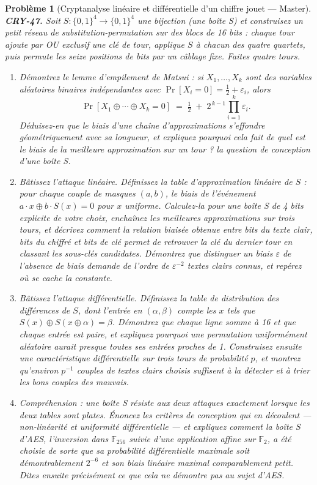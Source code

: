 \documentclass[11pt]{article}
\newtheorem{problem}{Problème}
\begin{document}
\begin{problem}[{Cryptanalyse linéaire et différentielle d'un chiffre jouet --- Master}]
\textbf{CRY-47.} Soit $S \colon \{0,1\}^4 \to \{0,1\}^4$ une bijection (une boîte S) et
construisez un petit réseau de substitution-permutation sur des blocs de 16 bits : chaque tour
ajoute par OU exclusif une clé de tour, applique $S$ à chacun des quatre quartets, puis
permute les seize positions de bits par un câblage fixe. Faites quatre tours.
\begin{enumerate}
\item[(a)] Démontrez le \textit{lemme d'empilement} de Matsui : si $X_1, \dots, X_k$ sont des
variables aléatoires binaires indépendantes avec $\Pr[X_i = 0] = \tfrac12 + \varepsilon_i$,
alors
\[ \Pr[X_1 \oplus \cdots \oplus X_k = 0] \;=\; \tfrac12 \;+\; 2^{\,k-1}
\prod_{i=1}^{k} \varepsilon_i . \]
Déduisez-en que le biais d'une chaîne d'approximations s'effondre géométriquement avec sa
longueur, et expliquez pourquoi cela fait de \og{} quel est le biais de la meilleure approximation
sur un tour ? \fg{} la question de conception d'une boîte S.
\item[(b)] Bâtissez l'attaque linéaire. Définissez la table d'approximation linéaire de $S$ : pour
chaque couple de masques $(a,b)$, le biais de l'événement $a \cdot x \oplus b \cdot S(x) = 0$
pour $x$ uniforme. Calculez-la pour une boîte S de 4 bits explicite de votre choix,
enchaînez les meilleures approximations sur trois tours, et décrivez comment la relation
biaisée obtenue entre bits du texte clair, bits du chiffré et bits de clé permet de retrouver
la clé du dernier tour en classant les sous-clés candidates. Démontrez que distinguer un biais
$\varepsilon$ de l'absence de biais demande de l'ordre de $\varepsilon^{-2}$ textes clairs
connus, et repérez où se cache la constante.
\item[(c)] Bâtissez l'attaque différentielle. Définissez la table de distribution des différences de
$S$, dont l'entrée en $(\alpha, \beta)$ compte les $x$ tels que $S(x) \oplus S(x \oplus \alpha) =
\beta$. Démontrez que chaque ligne somme à 16 et que chaque entrée est paire, et expliquez
pourquoi une permutation uniformément aléatoire aurait presque toutes ses entrées proches de 1.
Construisez ensuite une caractéristique différentielle sur trois tours de probabilité $p$, et
montrez qu'environ $p^{-1}$ couples de textes clairs choisis suffisent à la détecter et à
trier les bons couples des mauvais.
\item[(d)] Compréhension : une boîte S résiste aux deux attaques exactement lorsque les deux tables
sont plates. Énoncez les critères de conception qui en découlent --- non-linéarité et uniformité
différentielle --- et expliquez comment la boîte S d'AES, l'inversion dans
$\mathbb{F}_{256}$ suivie d'une application affine sur $\mathbb{F}_2$, a été choisie de
sorte que sa probabilité différentielle maximale soit démontrablement $2^{-6}$ et son biais
linéaire maximal comparablement petit. Dites ensuite précisément ce que cela ne démontre
\textit{pas} au sujet d'AES.
\end{enumerate}

\end{problem}
\end{document}
